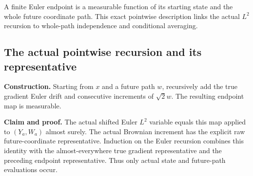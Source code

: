 \documentclass[11pt,a4paper]{report}
\begin{document}
A finite Euler endpoint is a measurable function of its starting state and the whole future coordinate path. This exact pointwise description links the actual \(L^2\) recursion to whole-path independence and conditional averaging.

\subsection{\texorpdfstring{The actual pointwise recursion and its representative}{The actual pointwise recursion and its representative}}
\label{report-step-WassersteinMixing-SemigroupEulerMap-lean-1}


\textbf{Construction.} Starting from \(x\) and a future path \(w\), recursively add the true gradient Euler drift and consecutive increments of \(\sqrt2w\). The resulting endpoint map is measurable.



\textbf{Claim and proof.} The actual shifted Euler \(L^2\) variable equals this map applied to \((Y_a,W_a)\) almost surely. The actual Brownian increment has the explicit raw future-coordinate representative. Induction on the Euler recursion combines this identity with the almost-everywhere true gradient representative and the preceding endpoint representative. Thus only actual state and future-path evaluations occur.
\end{document}
